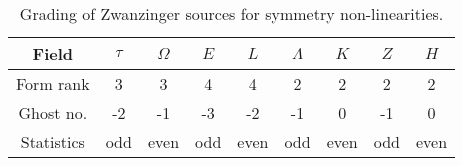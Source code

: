 \documentclass[../main.tex]{subfiles}
\begin{document}
\begin{table}[htpb]
  \caption{Grading of Zwanzinger sources for symmetry non-linearities.}%
  \label{tab:nl-sources}
  \begin{tabular}{ccccccccc}
    \toprule
    Field      & $\tau$ & $\Omega$ & $E$ & $L$  & $\Lambda$ & $K$  & $Z$ & $H$  \\
    \midrule
    Form rank  & 3      & 3        & 4   & 4    & 2         & 2    & 2   & 2    \\
    Ghost no.  & -2     & -1       & -3  & -2   & -1        & 0    & -1  & 0    \\
    Statistics & odd    & even     & odd & even & odd       & even & odd & even \\
    \bottomrule
  \end{tabular}
\end{table}
\end{document}

